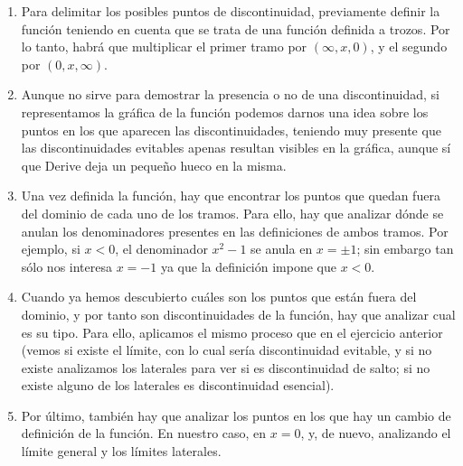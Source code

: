 \begin{enumerate}[leftmargin=*]
\begin{indicacion}
\begin{enumerate}
\item Para delimitar los posibles puntos de discontinuidad, previamente definir la función teniendo en cuenta que se trata de una función
definida a trozos. Por lo tanto, habrá que multiplicar el primer tramo por $(\infty,x,0)$, y el segundo por
$(0,x,\infty)$.
\item Aunque no sirve para demostrar la presencia o no de una discontinuidad, si representamos la gráfica de la función podemos darnos una
idea sobre los puntos en los que aparecen las discontinuidades, teniendo muy presente que las discontinuidades evitables apenas resultan
visibles en la gráfica, aunque sí que Derive deja un pequeño hueco en la misma.
\item Una vez definida la función, hay que encontrar los puntos que quedan fuera del dominio de cada uno de los tramos. Para ello, hay que
analizar dónde se anulan los denominadores presentes en las definiciones de ambos tramos. Por ejemplo, si $x<0$, el denominador $x^2-1$ se
anula en $x=\pm1$; sin embargo tan sólo nos interesa $x=-1$ ya que la definición impone que $x<0$.
\item Cuando ya hemos descubierto cuáles son los puntos que están fuera del dominio, y por tanto son discontinuidades de la función, hay que
analizar cual es su tipo. Para ello, aplicamos el mismo proceso que en el ejercicio anterior (vemos si existe el límite, con lo cual sería
discontinuidad evitable, y si no existe analizamos los laterales para ver si es discontinuidad de salto; si no existe alguno de los
laterales es discontinuidad esencial).
\item Por último, también hay que analizar los puntos en los que hay un cambio de definición de la función. En nuestro caso, en $x=0$, y, de
nuevo, analizando el límite general y los límites laterales.
\end{enumerate}
\end{indicacion}

\end{enumerate}


